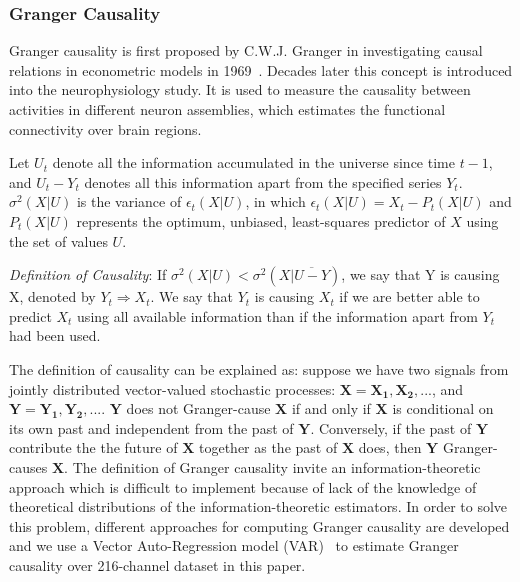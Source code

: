 \documentclass[conference]{IEEEtran}
\begin{document}
\subsubsection{Granger Causality}
Granger causality is first proposed by C.W.J. Granger in investigating causal relations in econometric models in 1969~\cite{granger1969investigating}. Decades later this concept is introduced into the neurophysiology study. It is used to measure the causality between activities in different neuron assemblies, which estimates the functional connectivity over brain regions. 

Let $U_t$ denote all the information accumulated in the universe since time $t-1$, and $U_t-Y_t$ denotes all this information apart from the specified series $Y_t$. $\sigma^2(X|U)$ is the variance of $\epsilon_t(X|U)$, in which $\epsilon_t(X|U)=X_t-P_t(X|U)$ and $P_t(X|U)$ represents the optimum, unbiased, least-squares predictor of $X$ using the set of values $U$.

\emph{Definition of Causality}: If $\sigma^2(X|U)<\sigma^2(X|\overline{U-Y})$, we say that Y is causing X, denoted by $Y_t \Rightarrow X_t$. We say that $Y_t$ is causing $X_t$ if we are better able to predict $X_t$ using all available information than if the information apart from $Y_t$ had been used.

The definition of causality can be explained as: suppose we have two signals from jointly distributed vector-valued stochastic processes: $\mathbf{X}=\mathbf{X_1}, \mathbf{X_2},...$, and $\mathbf{Y}=\mathbf{Y_1}, \mathbf{Y_2},...$. $\mathbf{Y}$ does not Granger-cause $\mathbf{X}$ if and only if $\mathbf{X}$ is conditional on its own past and independent from the past of $\mathbf{Y}$. Conversely, if the past of $\mathbf{Y}$ contribute the the future of $\mathbf{X}$ together as the past of $\mathbf{X}$ does, then $\mathbf{Y}$ Granger-causes $\mathbf{X}$. The definition of Granger causality invite an information-theoretic approach which is difficult to implement because of lack of the knowledge of theoretical distributions of the information-theoretic estimators. In order to solve this problem, different approaches for computing Granger causality are developed and we use a Vector Auto-Regression model (VAR)~\cite{barnett2014mvgc} to estimate Granger causality over 216-channel dataset in this paper.
\end{document}
